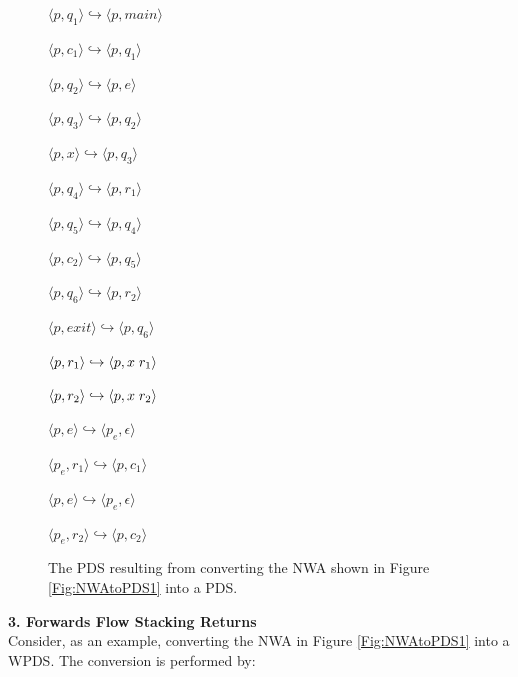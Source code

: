 \documentclass{llncs}
\begin{document}
\begin{figure}[htbp]
  \centering
    \begin{description}
      \centering
      \item $\langle p,q_1 \rangle \hookrightarrow \langle p,main \rangle$
      \item $\langle p,c_1 \rangle \hookrightarrow \langle p,q_1 \rangle$
      \item $\langle p,q_2 \rangle \hookrightarrow \langle p,e \rangle$
      \item $\langle p,q_3 \rangle \hookrightarrow \langle p,q_2 \rangle$
      \item $\langle p,x \rangle \hookrightarrow \langle p,q_3 \rangle$
      \item $\langle p,q_4 \rangle \hookrightarrow \langle p,r_1 \rangle$
      \item $\langle p,q_5 \rangle \hookrightarrow \langle p,q_4 \rangle$
      \item $\langle p,c_2 \rangle \hookrightarrow \langle p,q_5 \rangle$
      \item $\langle p,q_6 \rangle \hookrightarrow \langle p,r_2 \rangle$
      \item $\langle p,exit \rangle \hookrightarrow \langle p,q_6 \rangle$
      \item $\langle p,r_1 \rangle \hookrightarrow \langle p,x \hspace{.1cm} r_1 \rangle$
      \item $\langle p,r_2 \rangle \hookrightarrow \langle p,x \hspace{.1cm} r_2 \rangle$
      \item $\langle p,e \rangle \hookrightarrow \langle p_e, \epsilon \rangle$
      \item $\langle p_e,r_1 \rangle \hookrightarrow \langle p,c_1 \rangle$
      \item $\langle p,e \rangle \hookrightarrow \langle p_e, \epsilon \rangle$
      \item $\langle p_e,r_2 \rangle \hookrightarrow \langle p,c_2 \rangle$
    \end{description}
  \caption{The PDS resulting from converting the NWA shown in Figure \ref{Fig:NWAtoPDS1} into a PDS.}
  \label{Fig:NWAtoPDS5}
\end{figure}

\noindent \textbf{3. Forwards Flow Stacking Returns} \\

\noindent Consider, as an example, converting the NWA in Figure \ref{Fig:NWAtoPDS1} into a WPDS.  The conversion is performed by:
\end{document}
